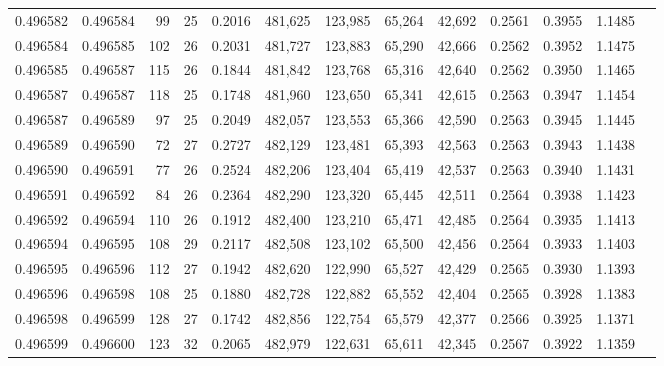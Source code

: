\begin{tabular}{rrrrrrrrrrrrr}
0.496582 & 0.496584 &  99 &  25 &                                     0.2016 & 481,625 & 123,985 &  65,264 &  42,692 & 0.2561 & 0.3955 & 1.1485 \\
0.496584 & 0.496585 & 102 &  26 &                                     0.2031 & 481,727 & 123,883 &  65,290 &  42,666 & 0.2562 & 0.3952 & 1.1475 \\
0.496585 & 0.496587 & 115 &  26 &                                     0.1844 & 481,842 & 123,768 &  65,316 &  42,640 & 0.2562 & 0.3950 & 1.1465 \\
0.496587 & 0.496587 & 118 &  25 &                                     0.1748 & 481,960 & 123,650 &  65,341 &  42,615 & 0.2563 & 0.3947 & 1.1454 \\
0.496587 & 0.496589 &  97 &  25 &                                     0.2049 & 482,057 & 123,553 &  65,366 &  42,590 & 0.2563 & 0.3945 & 1.1445 \\
0.496589 & 0.496590 &  72 &  27 &                                     0.2727 & 482,129 & 123,481 &  65,393 &  42,563 & 0.2563 & 0.3943 & 1.1438 \\
0.496590 & 0.496591 &  77 &  26 &                                     0.2524 & 482,206 & 123,404 &  65,419 &  42,537 & 0.2563 & 0.3940 & 1.1431 \\
0.496591 & 0.496592 &  84 &  26 &                                     0.2364 & 482,290 & 123,320 &  65,445 &  42,511 & 0.2564 & 0.3938 & 1.1423 \\
0.496592 & 0.496594 & 110 &  26 &                                     0.1912 & 482,400 & 123,210 &  65,471 &  42,485 & 0.2564 & 0.3935 & 1.1413 \\
0.496594 & 0.496595 & 108 &  29 &                                     0.2117 & 482,508 & 123,102 &  65,500 &  42,456 & 0.2564 & 0.3933 & 1.1403 \\
0.496595 & 0.496596 & 112 &  27 &                                     0.1942 & 482,620 & 122,990 &  65,527 &  42,429 & 0.2565 & 0.3930 & 1.1393 \\
0.496596 & 0.496598 & 108 &  25 &                                     0.1880 & 482,728 & 122,882 &  65,552 &  42,404 & 0.2565 & 0.3928 & 1.1383 \\
0.496598 & 0.496599 & 128 &  27 &                                     0.1742 & 482,856 & 122,754 &  65,579 &  42,377 & 0.2566 & 0.3925 & 1.1371 \\
0.496599 & 0.496600 & 123 &  32 &                                     0.2065 & 482,979 & 122,631 &  65,611 &  42,345 & 0.2567 & 0.3922 & 1.1359 \\

\end{tabular}
